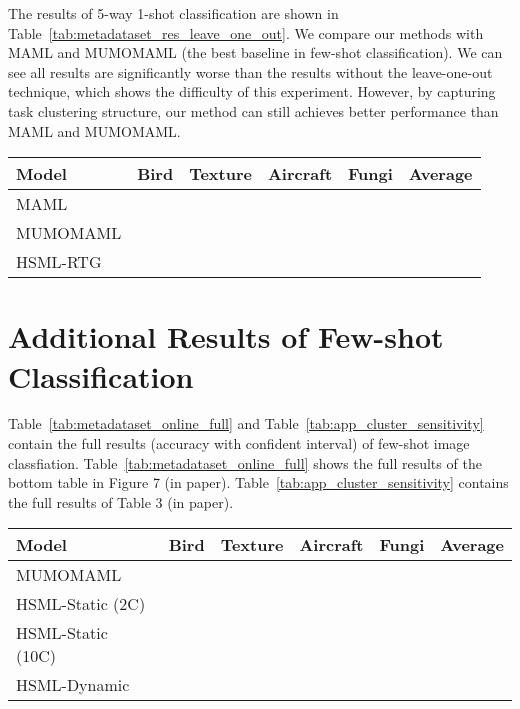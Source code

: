 \documentclass{article}
\begin{document}
The results of 5-way 1-shot classification are shown in Table~\ref{tab:metadataset_res_leave_one_out}. We compare our methods with MAML and MUMOMAML (the best baseline in few-shot classification). We can see all results are significantly worse than the results without the leave-one-out technique, which shows the difficulty of this experiment. However, by capturing task clustering structure, our method can still achieves better performance than MAML and MUMOMAML.
\begin{table*}[!htbp]
\caption{Comparison of leave-one-out experiments on 5-way 1-shot classification. 4000 tasks are used to test the performance. For each dataset, the performance is reported when this dataset is used for meta-testing.}
\label{tab:metadataset_res_leave_one_out}
\begin{center}
\begin{tabular}{l|c|c|c|c|c}
\hline
Model & Bird & Texture & Aircraft & Fungi & Average \\\hline
MAML &  &  &  &  &  \\
MUMOMAML &  &  &  &  & \\
HSML-RTG &  &  &  &  & \\\hline
\end{tabular}
\end{center}
\end{table*}
\section{Additional Results of Few-shot Classification}
\label{app:additional_results}
Table~\ref{tab:metadataset_online_full} and Table~\ref{tab:app_cluster_sensitivity} contain the full results (accuracy with  confident interval) of few-shot image classfiation. Table~\ref{tab:metadataset_online_full} shows the full results of the bottom table in Figure 7 (in paper). Table~\ref{tab:app_cluster_sensitivity} contains the full results of Table 3 (in paper).
\label{app:classification}
\begin{table*}[!htbp]
\caption{Comparison of online update results on few-shot image classification 5-way 1-shot scenario (Full Table).}
\label{tab:metadataset_online_full}
\begin{center}
\begin{tabular}{l|c|c|c|c|c}
\hline
Model & Bird & Texture & Aircraft & Fungi & Average \\\hline
MUMOMAML &  &  &  &  &  \\
HSML-Static (2C) &  &  &  &  & \\
HSML-Static (10C) &  &  &  &  & \\
HSML-Dynamic &  &  &  &  & \\\hline
\end{tabular}
\end{center}
\end{table*}
\end{document}
